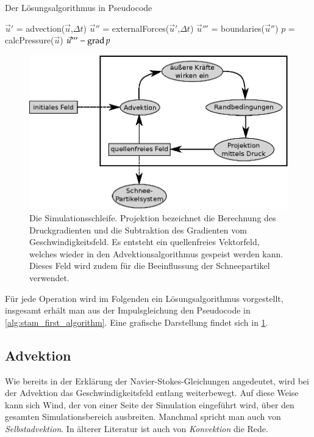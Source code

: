 \begin{algorithm}
\caption{Der Lösungsalgorithmus in Pseudocode}
\label{alg:stam_first_algorithm}
\begin{algorithmic}
	\State $\vec{u}'$ = advection($\vec{u}$,$\Delta t$)
	\State $\vec{u}''$ = externalForces($\vec{u}'$,$\Delta t$)
	\State $\vec{u}'''$ = boundaries($\vec{u}''$)
	\State $p$ = calcPressure($\vec{u}$)
	\State \Return $\vec{u}''' - \operatorname*{grad} p$
\EndFunction
\end{algorithmic}
\end{algorithm}

\begin{figure}[h]
\centering
\includegraphics[width=12cm]{images/stam_loop_with_projection}
\caption{Die Simulationsschleife. Projektion bezeichnet die Berechnung des Druckgradienten und die Subtraktion des Gradienten vom Geschwindigkeitsfeld. Es entsteht ein quellenfreies Vektorfeld, welches wieder in den Advektionsalgorithmus gespeist werden kann. Dieses Feld wird zudem für die Beeinflussung der Schneepartikel verwendet.}
\label{fig:stam_loop_with_projection}
\end{figure}

Für jede Operation wird im Folgenden ein Lösungsalgorithmus
vorgestellt, insgesamt erhält man aus der Impulsgleichung den Pseudocode in
\cref{alg:stam_first_algorithm}. Eine grafische Darstellung findet
sich in \cref{fig:stam_loop_with_projection}.

\subsection{Advektion}
\label{sec:stam_advection}

Wie bereits in der Erklärung der Navier-Stokes-Gleichungen angedeutet, wird bei
der Advektion das Geschwindigkeitsfeld entlang 
weiterbewegt. Auf diese Weise kann sich Wind, der von einer Seite der
Simulation eingeführt wird, über den gesamten Simulationsbereich ausbreiten.
Manchmal spricht man auch von \emph{Selbstadvektion}. In älterer Literatur
ist auch von \emph{Konvektion} die Rede.

